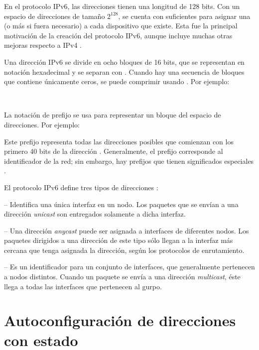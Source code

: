 En el protocolo IPv6, las direcciones tienen una longitud de 128 bits. Con un
espacio de direcciones de tamaño $2^128$, se cuenta con suficientes para asignar
una (o más si fuera necesario) a cada dispositivo que existe. Esta fue la
principal motivación de la creación del protocolo IPv6, aunque incluye muchas
otras mejoras respecto a IPv4 \cite{Hagen2006}.

Una dirección IPv6 se divide en ocho bloques de 16 bits, que se representan en
notación hexadecimal y se separan con \code{:}. Cuando hay una secuencia de
bloques que contiene únicamente ceros, se puede comprimir usando \code{::}. Por
ejemplo:

\noindent{}\\

La notación de prefijo se usa para representar un bloque del espacio de
direcciones. Por ejemplo:

\noindent{}

Este prefijo representa todas las direcciones posibles que comienzan con
los primero 40 bits de la dirección . Generalmente, el
prefijo corresponde al identificador de la red; sin embargo, hay prefijos que
tienen significados especiales \cite{Hagen2006}.

El protocolo IPv6 define tres tipos de direcciones \cite{CiscoIpv62011}:

 -- Identifica una única interfaz en un nodo. Los
paquetes que se envían a una dirección \textit{unicast} son entregados
solamente a dicha interfaz.

 -- Una dirección \textit{anycast} puede ser asignada
a interfaces de diferentes nodos. Los paquetes dirigidos a una dirección de este
tipo sólo llegan a la interfaz más cercana que tenga asignada la dirección,
según los protocolos de enrutamiento.

 -- Es un identificador para un conjunto de
interfaces, que generalmente pertenecen a nodos distintos. Cuando un paquete
se envía a una dirección \textit{multicast}, éste llega a todas las interfaces
que pertenecen al gurpo.


\section{Autoconfiguración de direcciones con estado}

